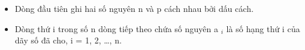 \begin{itemize}
	\item     Dòng đầu tiên ghi hai số nguyên n và p cách nhau bởi dấu cách.   
	\item     Dòng thứ i trong số n dòng tiếp theo chứa số nguyên a    $_     i    $    là số hạng thứ i của dãy số đã  cho, i = 1, 2, …, n.   
\end{itemize}